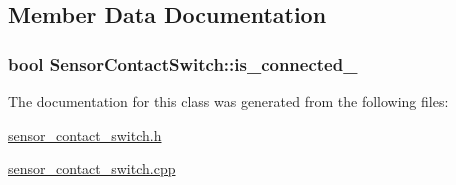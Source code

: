 \subsection{Member Data Documentation}
\hypertarget{class_sensor_contact_switch_a38d5bad22015b2013e776dec61bc8622}{}
\subsubsection[{is\+\_\+connected\+\_\+}]{\setlength{\rightskip}{0pt plus 5cm}bool Sensor\+Contact\+Switch\+::is\+\_\+connected\+\_\+}\label{class_sensor_contact_switch_a38d5bad22015b2013e776dec61bc8622}


The documentation for this class was generated from the following files\+:\begin{DoxyCompactItemize}
\item 
\hyperlink{sensor__contact__switch_8h}{sensor\+\_\+contact\+\_\+switch.\+h}\item 
\hyperlink{sensor__contact__switch_8cpp}{sensor\+\_\+contact\+\_\+switch.\+cpp}\end{DoxyCompactItemize}

